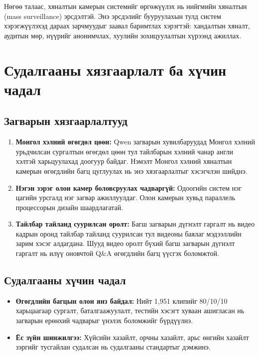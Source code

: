 Нөгөө талаас, хяналтын камерын системийг өргөжүүлэх нь нийгмийн хяналтын (mass surveillance) эрсдэлтэй. Энэ эрсдэлийг бууруулахын тулд систем хэрэгжүүлэхэд дараах зарчмуудыг заавал баримтлах хэрэгтэй: хандалтын хяналт, аудитын мөр, нүүрийг анонимчлах, хуулийн зохицуулалтын хүрээнд ажиллах.

\section{Судалгааны хязгаарлалт ба хүчин чадал}

\subsection{Загварын хязгаарлалтууд}

\begin{enumerate}
    \item \textbf{Монгол хэлний өгөгдөл цөөн:} Qwen загварын хувилбаруудад Монгол хэлний урьдчилсан сургалтын өгөгдөл цөөн тул тайлбарын хэлний чанар англи хэлтэй харьцуулахад доогуур байдаг. Нэмэлт Монгол хэлний хяналтын камерын өгөгдлийн багц цуглуулах нь энэ хязгаарлалтыг хэсэгчлэн шийднэ.

    \item \textbf{Нэгэн зэрэг олон камер боловсруулах чадваргүй:} Одоогийн систем нэг цагийн урсгалд нэг загвар ажиллуулдаг. Олон камерын хувьд параллель процессорын дизайн шаардлагатай.

    \item \textbf{Тайлбар тайланд суурилсан оролт:} Багш загварын дүгнэлт гаргалт нь видео кадрын оронд тайлбар тайланд суурилсан тул видеоны баялаг мэдээллийн зарим хэсэг алдагдана. Шууд видео оролт бүхий багш загварын дүгнэлт гаргалт нь илүү оновчтой Q\&A өгөгдлийн багц үүсгэх боломжтой.

\end{enumerate}

\subsection{Судалгааны хүчин чадал}

\begin{itemize}
    \item \textbf{Өгөгдлийн багцын олон янз байдал:} Нийт 1,951 клипийг 80/10/10 харьцаагаар сургалт, баталгаажуулалт, тестийн хэсэгт хуваан ашигласан нь загварын ерөнхий чадварыг үнэлэх боломжийг бүрдүүлнэ.
    \item \textbf{Ёс зүйн шинжилгээ:} Хүйсийн хазайлт, орчны хазайлт, арьс өнгийн хазайлт зэргийг тусгайлан судалсан нь судалгааны стандартыг дэмжинэ.
\end{itemize}

